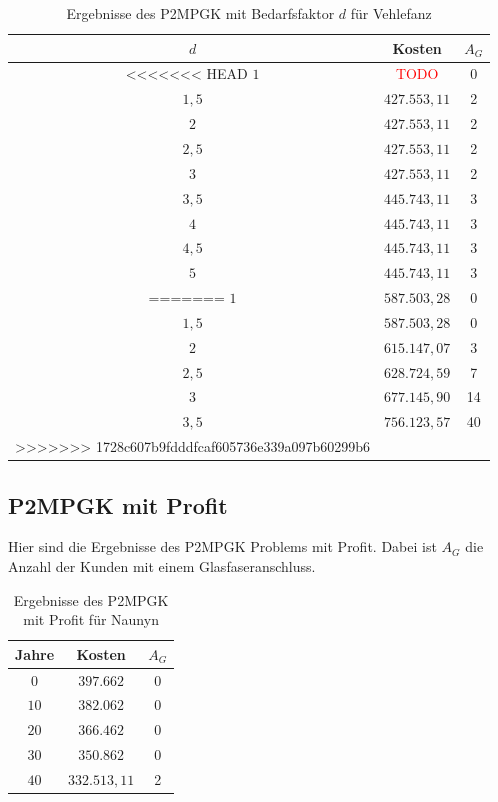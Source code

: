\documentclass[11pt,a4paper]{article}
\newcommand{\TODO}{\textcolor{red}{TODO}}
\theoremstyle{my_th_style1}
\begin{document}
\begin{table}[!htbp]
	\centering
	\begin{tabular}{c|c|c}
		\centering
		$d$ & Kosten & $A_G$ \\	
		\hline
<<<<<<< HEAD
		$1$   	 &  \TODO& 0  \\
		$1,5$ 	&   $427.553,11$  & 2  \\
		$2$   	&   $427.553,11$ & 2  \\
		$2,5$   	&   $427.553,11$ & 2  \\
		$3$    &   $427.553,11$ & 2  \\
		$3,5$   	&   $445.743,11$ & 3  \\
		$4$   	&   $445.743,11$& 3  \\
		$4,5$    & $445.743,11$ & 3 \\
		$5$   	&   $445.743,11$& 3  \\	
=======
		$1$   	 &  \(587.503,28\) & 0  \\
		$1,5$ 	&   $587.503,28$  & 0  \\
		$2$   	&   $615.147,07$ & 3 \\
		$2,5$   	&   $628.724,59$ & 7 \\
		$3$    &   $677.145,90$ & 14 \\
		$3,5$   	&   $756.123,57$ & 40 \\
>>>>>>> 1728c607b9fdddfcaf605736e339a097b60299b6
	\end{tabular}
	\caption{Ergebnisse des P2MPGK mit Bedarfsfaktor $d$ f\"ur Vehlefanz} 
	\label{P2MPGKBedarfV}
\end{table}

\vspace{5cm}

\subsection*{P2MPGK mit Profit}
Hier sind die Ergebnisse des P2MPGK Problems mit Profit. Dabei ist $A_G$ die Anzahl der Kunden mit einem Glasfaseranschluss.

\begin{table}[!htbp]
	\centering
	\begin{tabular}{c|c|c}
		\centering
		Jahre & Kosten & $A_G$ \\	
		\hline
		$0$   	 & \(397.662\) & 0  \\
		$10$ 	&  \(382.062\) & 0  \\
		$20$   	&  \(366.462\)  & 0  \\
		$30$    &  \(350.862\) & 0  \\
		$40$    &  \(332.513,11\)  & 2 \\
	\end{tabular}
	\caption{Ergebnisse des P2MPGK mit Profit f\"ur Naunyn} 
	\label{P2MPGKProfitN}
\end{table}
\end{document}
